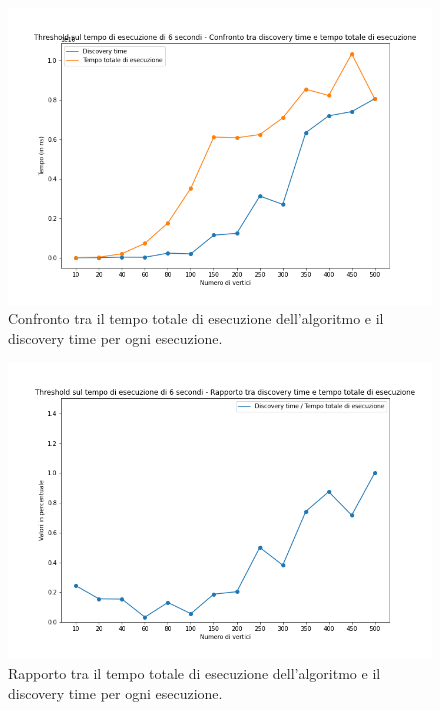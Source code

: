 \begin{figure}[H]
	\centering
	\includegraphics[width=1\textwidth]{res/images/single/karger-stein/discovery-time/threshold6/karger_stein_confronto_discovery_time_total_time_threshold_6s.png}
	\caption{Confronto tra il tempo totale di esecuzione dell'algoritmo e il discovery time per ogni esecuzione.}
	\label{fig:karger_stein_confronto_discovery_time_total_time_threshold_6s}
\end{figure}

\begin{figure}[H]
	\centering
	\includegraphics[width=1\textwidth]{res/images/single/karger-stein/discovery-time/threshold6/karger_stein_rapporto_discovery_time_total_time_threshold_6s.png}
	\caption{Rapporto tra il tempo totale di esecuzione dell'algoritmo 
	e il discovery time per ogni esecuzione.}
	\label{fig:karger_stein_rapporto_discovery_time_total_time_threshold_6s}
\end{figure}

